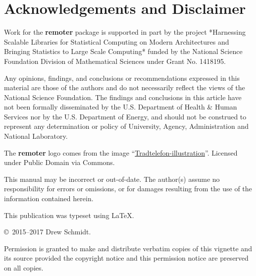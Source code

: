 \section*{Acknowledgements and Disclaimer}
Work for the \textbf{remoter} package is supported in part by the project 
*Harnessing Scalable Libraries for Statistical Computing on Modern Architectures 
and Bringing Statistics to Large Scale Computing* funded by the National 
Science Foundation Division of Mathematical Sciences under Grant No. 1418195.

Any opinions, findings, and conclusions or recommendations expressed in  this 
material are those of the authors and do not necessarily reflect the  views of 
the National Science Foundation.  The findings and conclusions in this article 
have not been formally disseminated by the U.S. Department of Health \& Human 
Services nor by the U.S. Department of Energy, and should not be construed to 
represent any determination or policy of University, Agency, Administration and 
National Laboratory.

The \textbf{remoter} logo comes from the image
``\href{https://commons.wikimedia.org/wiki/File:Tr\%C3\%A5dtelefon-illustration.png\#/media/File:Tr\%C3\%A5dtelefon-illustration.png}{Tradtelefon-illustration}''. 
Licensed under Public Domain via Commons.

This manual may be incorrect or out-of-date.  The author(s) assume
no responsibility for errors or omissions, or for damages resulting
from the use of the information contained herein.

This publication was typeset using \LaTeX.

\vfill

\null
\vfill
\copyright\ 2015--2017 Drew Schmidt.

Permission is granted to make and distribute verbatim copies of
this vignette and its source provided the copyright notice and
this permission notice are preserved on all copies.
